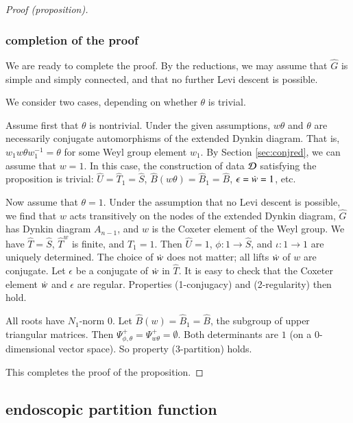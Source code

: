 \begin{proof}[Proof (proposition)]
\subsubsection{completion of the proof}

We are ready to complete the proof.  By the reductions, we may assume
that $\hat G$ is simple and simply connected, and that no further Levi
descent is possible.

We consider two cases, depending on whether $\theta$ is trivial.

Assume first that $\theta$ is nontrivial.  Under the given
assumptions, $w\theta$ and $\theta$ are necessarily conjugate
automorphisms of the extended Dynkin diagram.  That is, $w_1 w \theta
w_1^{-1} = \theta$ for some Weyl group element $w_1$.  By Section
\ref{sec:conjred}, we can assume that $w=1$.  In this case, the
construction of data $\mathcal D$ satisfying the proposition
is trivial: $\hat U = \hat T_1 =\hat S$,
$\hat B(w\theta) = \hat B_1 = \hat B$, $\epsilon = \dot w = 1$, etc.

Now assume that $\theta=1$.  Under the assumption that no Levi descent
is possible, we find that $w$ acts transitively on the nodes of the
extended Dynkin diagram, $\hat G$ has Dynkin diagram $A_{n-1}$, and
$w$ is the Coxeter element of the Weyl group.  We have $\hat T = \hat
S$, $\hat T^w$ is finite, and $\hat T_1 = 1$.  Then $\hat U = 1$,
$\phi:1\to \hat S$, and $\iota:1\to 1$ are uniquely determined.  The
choice of $\dot w$ does not matter; all lifts $\dot w$ of $w$ are
conjugate.  Let $\epsilon$ be a conjugate of $\dot w$ in $\hat T$.  It
is easy to check that the Coxeter element $\dot w$ and $\epsilon$ are
regular.  Properties (1-conjugacy) and (2-regularity) then hold.

All roots have $N_1$-norm $0$.  Let $\hat B(w) = \hat B_1 = \hat B$,
the subgroup of upper triangular matrices.  Then $\Psi_{\phi,\theta}^+
= \Psi_{w\theta}^+=\emptyset$.  Both determinants are $1$ (on a
$0$-dimensional vector space).  So property (3-partition) holds.

This completes the proof of the proposition.
\end{proof}


\subsection{endoscopic partition function}

